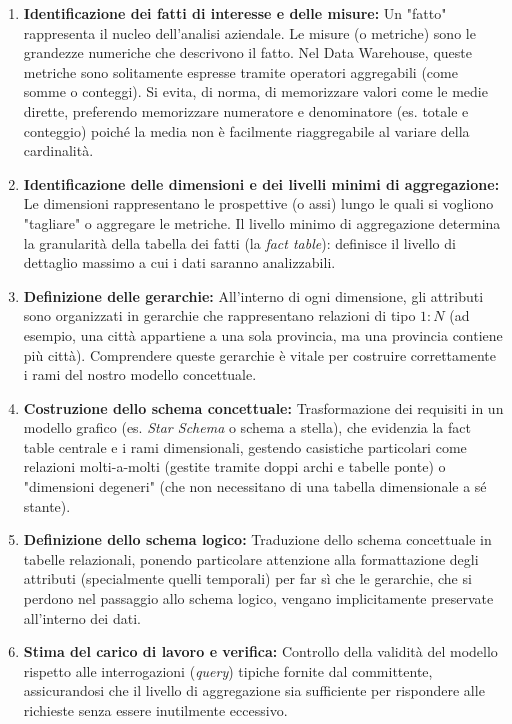 \begin{enumerate}
    \item \textbf{Identificazione dei fatti di interesse e delle misure:} Un "fatto" rappresenta il nucleo dell'analisi aziendale. Le misure (o metriche) sono le grandezze numeriche che descrivono il fatto. Nel Data Warehouse, queste metriche sono solitamente espresse tramite operatori aggregabili (come somme o conteggi). Si evita, di norma, di memorizzare valori come le medie dirette, preferendo memorizzare numeratore e denominatore (es. totale e conteggio) poiché la media non è facilmente riaggregabile al variare della cardinalità.
    \item \textbf{Identificazione delle dimensioni e dei livelli minimi di aggregazione:} Le dimensioni rappresentano le prospettive (o assi) lungo le quali si vogliono "tagliare" o aggregare le metriche. Il livello minimo di aggregazione determina la granularità della tabella dei fatti (la \textit{fact table}): definisce il livello di dettaglio massimo a cui i dati saranno analizzabili.
    \item \textbf{Definizione delle gerarchie:} All'interno di ogni dimensione, gli attributi sono organizzati in gerarchie che rappresentano relazioni di tipo $1:N$ (ad esempio, una città appartiene a una sola provincia, ma una provincia contiene più città). Comprendere queste gerarchie è vitale per costruire correttamente i rami del nostro modello concettuale.
    \item \textbf{Costruzione dello schema concettuale:} Trasformazione dei requisiti in un modello grafico (es. \textit{Star Schema} o schema a stella), che evidenzia la fact table centrale e i rami dimensionali, gestendo casistiche particolari come relazioni molti-a-molti (gestite tramite doppi archi e tabelle ponte) o "dimensioni degeneri" (che non necessitano di una tabella dimensionale a sé stante).
    \item \textbf{Definizione dello schema logico:} Traduzione dello schema concettuale in tabelle relazionali, ponendo particolare attenzione alla formattazione degli attributi (specialmente quelli temporali) per far sì che le gerarchie, che si perdono nel passaggio allo schema logico, vengano implicitamente preservate all'interno dei dati.
    \item \textbf{Stima del carico di lavoro e verifica:} Controllo della validità del modello rispetto alle interrogazioni (\textit{query}) tipiche fornite dal committente, assicurandosi che il livello di aggregazione sia sufficiente per rispondere alle richieste senza essere inutilmente eccessivo.
\end{enumerate}

